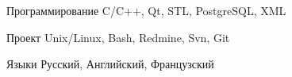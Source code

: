 

\begin{cvskills}

  \cvskill
    {Программирование} %
    {C/C++, Qt, STL, PostgreSQL, XML} %

  \cvskill
    {\faCodeFork\acvHeaderIconSep Проект} %
    {Unix/Linux, Bash, Redmine, Svn, Git} %

  \cvskill
    {\faLanguage\acvHeaderIconSep Языки} %
    {Русский, Английский, Французский} %

\end{cvskills}
